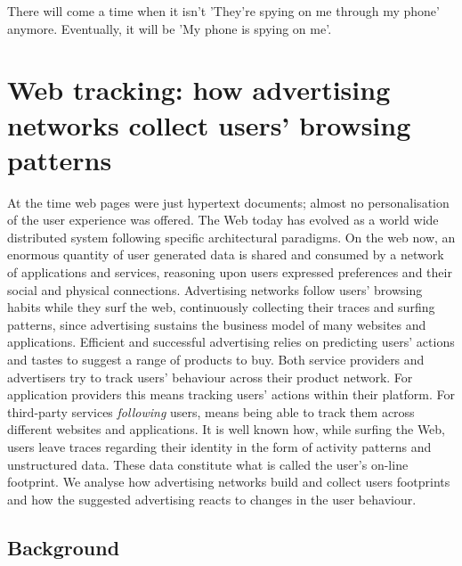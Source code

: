 \begin{savequote}[75mm]
There will come a time when it isn't 'They're spying on me through my phone' anymore. Eventually, it will be 'My phone is spying on me'.
\end{savequote}

\chapter{Web tracking: how advertising networks collect users' browsing patterns}

 At the time web pages were just hypertext documents; almost no personalisation of the user experience was offered. The Web today has evolved as a world wide distributed system following specific architectural paradigms. On the web now, an enormous quantity of user generated data is shared and consumed by a network of applications and services, reasoning upon users expressed preferences and their social and physical connections. Advertising networks follow users' browsing habits while they surf the web, continuously collecting their traces and surfing patterns, since advertising sustains the business model of many websites and applications. Efficient and successful advertising relies on predicting users' actions and tastes to suggest a range of products to buy. Both service providers and advertisers try to track users' behaviour across their product network. For application providers this means tracking users' actions within their platform. For third-party services \emph{following} users, means being able to track them across different websites and applications. It is well known how, while surfing the Web, users leave traces regarding their identity in the form of activity patterns and unstructured data. These data constitute what is called the user's on-line footprint. We analyse how advertising networks build and collect users footprints and how the suggested advertising reacts to changes in the user behaviour.

\section{Background}

